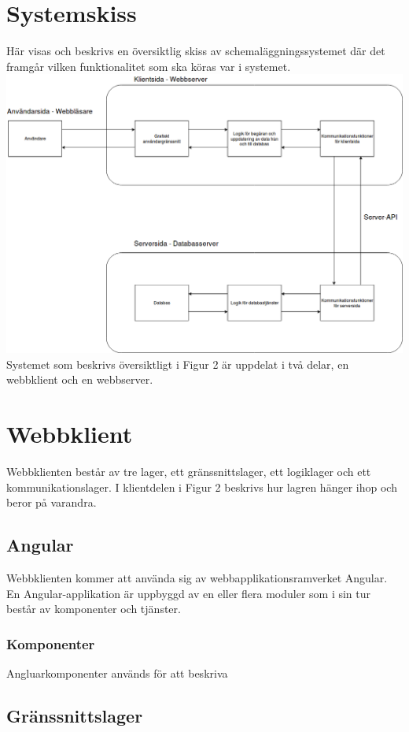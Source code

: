 \documentclass[a4paper,10pt]{article}
\begin{document}
\section{Systemskiss}
\label{sec:Systemskiss}
Här visas och beskrivs en översiktlig skiss av schemaläggningssystemet där det framgår vilken funktionalitet som ska köras var i systemet. \\
\includegraphics[width=.9\linewidth,height=.7\textheight]{Systemskiss.png}
\\
Systemet som beskrivs översiktligt i Figur 2 är uppdelat i två delar, en webbklient och en webbserver.
\section{Webbklient}
Webbklienten består av tre lager, ett gränssnittslager, ett logiklager och ett kommunikationslager. I klientdelen i Figur 2 beskrivs hur lagren hänger ihop och beror på varandra.

\subsection{Angular}
Webbklienten kommer att använda sig av webbapplikationsramverket Angular. En Angular-applikation är uppbyggd av en eller flera moduler som i sin tur består av komponenter och tjänster.
\subsubsection{Komponenter}
Angluarkomponenter används för att beskriva 
\subsection{Gränssnittslager}
   



\end{document}
